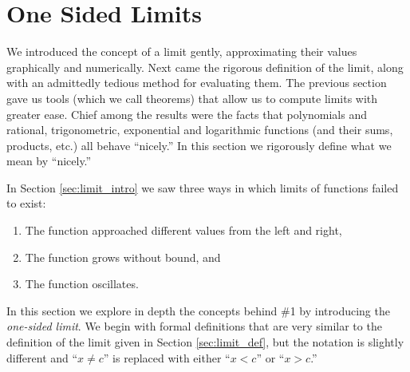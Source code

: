 \section{One Sided Limits}\label{sec:limit_continuity}

%

We introduced the concept of a limit gently, approximating their values graphically and numerically. Next came the rigorous definition of the limit, along with an admittedly tedious method for evaluating them. The previous section gave us tools (which we call theorems) that allow us to compute limits with greater ease. Chief among the results were the facts that polynomials and rational, trigonometric, exponential and logarithmic functions (and their sums, products, etc.) all behave ``nicely.'' In this section we rigorously define what we mean by ``nicely.''

In Section \ref{sec:limit_intro} we saw three ways in which limits of functions failed to exist: 
	\begin{enumerate}
	\item	The function approached different values from the left and right,
	\item	The function grows without bound, and 
	\item	The function oscillates.
	\end{enumerate}
	
In this section we explore in depth the concepts behind \#1 by introducing the \textit{one-sided limit}. We begin with formal definitions that are very similar to the definition of the limit given in Section \ref{sec:limit_def}, but the notation is slightly different and ``$x\neq c$'' is replaced with either ``$x<c$'' or ``$x>c$.''

